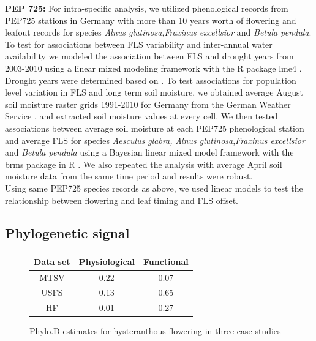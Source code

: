 \documentclass[12pt]{article}\usepackage[]{graphicx}\usepackage[]{color}
\begin{document}
\indent \textbf{PEP 725:} For intra-specific analysis, we utilized phenological records from PEP725 stations in Germany with more than 10 years worth of flowering and leafout records \citep{PEP725} for species \textit{Alnus glutinosa},\textit{Fraxinus excellsior} and \textit {Betula pendula}. To test for associations between FLS variability and inter-annual water availability we modeled the association between FLS and drought years from 2003-2010 using a linear mixed modeling framework with the R package lme4 \citep{Bates2014}. Drought years were determined based on \citet{Ivits_2013}. To test associations for population level variation in FLS and long term soil moisture, we obtained average August soil moisture raster grids 1991-2010 for Germany from the German Weather Service \citep{DWD}, and extracted soil moisture values at every cell. We then tested associations between average soil moisture at each PEP725 phenological station and average FLS for species \textit{Aesculus glabra,} \textit{Alnus glutinosa},\textit{Fraxinus excellsior} and \textit {Betula pendula} using a Bayesian linear mixed model framework with the brms package in R \citep{Burkner2018}. We also repeated the analysis with average April soil moisture data from the same time period and results were robust.\\
\indent Using same PEP725 species records as above, we used linear models to test the relationship between flowering and leaf timing and FLS offset.\\
\subsection*{Phylogenetic signal}
\begin{figure}[h!]
\begin{tabular}[width=\textwidth]{|c|c|c|}
\hline
Data set&Physiological&Functional\\
\hline
MTSV&0.22&0.07\\
USFS&0.13&0.65\\
HF&0.01&0.27\\
\hline
\end{tabular}
\caption{Phylo.D estimates for hysteranthous flowering in three case studies}
\label{fig:Figure 7}
\end{figure}
\end{document}
